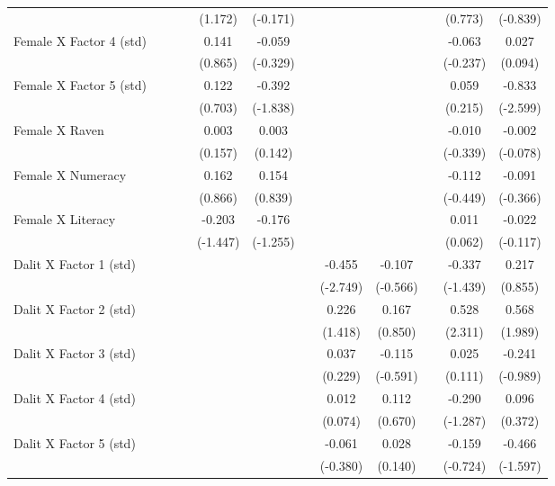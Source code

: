 {\begin{longtable}{@{\extracolsep{\fill}}lccccccccccc}
      &   &   &   & (1.172) & (-0.171) &   &   &   &   & (0.773) & (-0.839) \\
    Female X Factor 4 (std) &   &   &   & 0.141 & -0.059 &   &   &   &   & -0.063 & 0.027 \\
      &   &   &   & (0.865) & (-0.329) &   &   &   &   & (-0.237) & (0.094) \\
    Female X Factor 5 (std) &   &   &   & 0.122 & -0.392 &   &   &   &   & 0.059 & -0.833 \\
      &   &   &   & (0.703) & (-1.838) &   &   &   &   & (0.215) & (-2.599) \\
    Female X Raven &   &   &   & 0.003 & 0.003 &   &   &   &   & -0.010 & -0.002 \\
      &   &   &   & (0.157) & (0.142) &   &   &   &   & (-0.339) & (-0.078) \\
    Female X Numeracy &   &   &   & 0.162 & 0.154 &   &   &   &   & -0.112 & -0.091 \\
      &   &   &   & (0.866) & (0.839) &   &   &   &   & (-0.449) & (-0.366) \\
    Female X Literacy &   &   &   & -0.203 & -0.176 &   &   &   &   & 0.011 & -0.022 \\
      &   &   &   & (-1.447) & (-1.255) &   &   &   &   & (0.062) & (-0.117) \\
    Dalit X Factor 1 (std) &   &   &   &   &   &   & -0.455 & -0.107 &   & -0.337 & 0.217 \\
      &   &   &   &   &   &   & (-2.749) & (-0.566) &   & (-1.439) & (0.855) \\
    Dalit X Factor 2 (std) &   &   &   &   &   &   & 0.226 & 0.167 &   & 0.528 & 0.568 \\
      &   &   &   &   &   &   & (1.418) & (0.850) &   & (2.311) & (1.989) \\
    Dalit X Factor 3 (std) &   &   &   &   &   &   & 0.037 & -0.115 &   & 0.025 & -0.241 \\
      &   &   &   &   &   &   & (0.229) & (-0.591) &   & (0.111) & (-0.989) \\
    Dalit X Factor 4 (std) &   &   &   &   &   &   & 0.012 & 0.112 &   & -0.290 & 0.096 \\
      &   &   &   &   &   &   & (0.074) & (0.670) &   & (-1.287) & (0.372) \\
    Dalit X Factor 5 (std) &   &   &   &   &   &   & -0.061 & 0.028 &   & -0.159 & -0.466 \\
      &   &   &   &   &   &   & (-0.380) & (0.140) &   & (-0.724) & (-1.597) \\

\end{longtable}}
